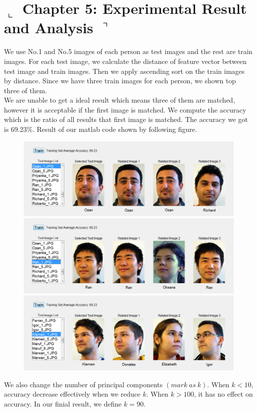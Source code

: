 \documentclass[]{article}
\begin{document}
\section*{ $\llcorner$  Chapter 5: Experimental Result and Analysis $\urcorner$}
We use No.1 and No.5 images of each person as test images and the rest are train images. For each test image, we calculate the distance of feature vector between test image and train images. Then we apply ascending sort on the train images by distance. Since we have three train images for each person, we shown top three of them.
\\

We are unable to get a ideal result which means three of them are matched, however it is acceptable if the first image is matched. We compute the accuracy which is the ratio of all results that first image is matched. The accuracy we got is 69.23$ \% $. Result of our matlab code shown by following figure.
\begin{figure}[H]
\centering
\includegraphics[width=0.7\linewidth]{./PCA2.png}
\includegraphics[width=0.7\linewidth]{./PCA4.png}
\includegraphics[width=0.7\linewidth]{./PCA5.png}
\caption{}
\end{figure}


We also change the number of principal components $ (mark \ as \ k ) $. When $ k < 10 $, accuracy decrease effectively when we reduce $ k $. When $ k > 100 $, it has no effect on accuracy. In our finial result, we define $ k = 90 $.
\end{document}
